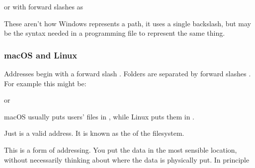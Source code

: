\documentclass[letterpaper,10pt,british]{sphinxmanual}
\begin{document}
\sphinxAtStartPar
or with forward slashes  as

\begin{sphinxVerbatim}[commandchars=\\\{\}]
\end{sphinxVerbatim}

\sphinxAtStartPar
These aren’t how Windows represents a path, it uses a single backslash, but may be the syntax needed in a programming file to represent the same thing.


\subsubsection{macOS and Linux}
\label{\detokenize{chapters/computer_software/files_and_folders:macos-and-linux}}
\sphinxAtStartPar
Addresses begin with a forward slash . Folders are separated by forward slashes . For example this might be:

\begin{sphinxVerbatim}[commandchars=\\\{\}]
\end{sphinxVerbatim}

\sphinxAtStartPar
or

\begin{sphinxVerbatim}[commandchars=\\\{\}]
\end{sphinxVerbatim}

\sphinxAtStartPar
macOS usually puts users’ files in , while Linux puts them in .

\sphinxAtStartPar
Just  is a valid address. It is known as the  of the filesystem.

\sphinxAtStartPar
This is a form of  addressing. You put the data in the most sensible location, without necessarily thinking about where the data is physically put. In principle

\begin{sphinxVerbatim}[commandchars=\\\{\}]
\end{sphinxVerbatim}
\end{document}
